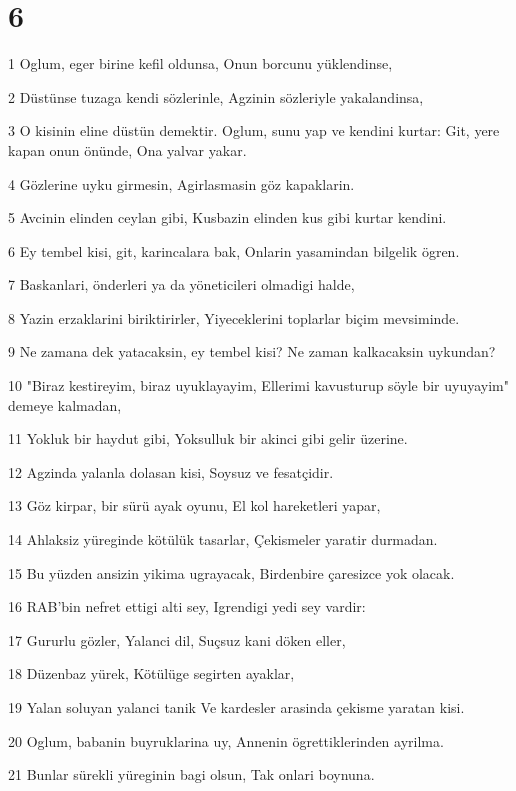 \chapter{6}

\par 1 Oglum, eger birine kefil oldunsa, Onun borcunu yüklendinse,
\par 2 Düstünse tuzaga kendi sözlerinle, Agzinin sözleriyle yakalandinsa,
\par 3 O kisinin eline düstün demektir. Oglum, sunu yap ve kendini kurtar: Git, yere kapan onun önünde, Ona yalvar yakar.
\par 4 Gözlerine uyku girmesin, Agirlasmasin göz kapaklarin.
\par 5 Avcinin elinden ceylan gibi, Kusbazin elinden kus gibi kurtar kendini.
\par 6 Ey tembel kisi, git, karincalara bak, Onlarin yasamindan bilgelik ögren.
\par 7 Baskanlari, önderleri ya da yöneticileri olmadigi halde,
\par 8 Yazin erzaklarini biriktirirler, Yiyeceklerini toplarlar biçim mevsiminde.
\par 9 Ne zamana dek yatacaksin, ey tembel kisi? Ne zaman kalkacaksin uykundan?
\par 10 "Biraz kestireyim, biraz uyuklayayim, Ellerimi kavusturup söyle bir uyuyayim" demeye kalmadan,
\par 11 Yokluk bir haydut gibi, Yoksulluk bir akinci gibi gelir üzerine.
\par 12 Agzinda yalanla dolasan kisi, Soysuz ve fesatçidir.
\par 13 Göz kirpar, bir sürü ayak oyunu, El kol hareketleri yapar,
\par 14 Ahlaksiz yüreginde kötülük tasarlar, Çekismeler yaratir durmadan.
\par 15 Bu yüzden ansizin yikima ugrayacak, Birdenbire çaresizce yok olacak.
\par 16 RAB'bin nefret ettigi alti sey, Igrendigi yedi sey vardir:
\par 17 Gururlu gözler, Yalanci dil, Suçsuz kani döken eller,
\par 18 Düzenbaz yürek, Kötülüge segirten ayaklar,
\par 19 Yalan soluyan yalanci tanik Ve kardesler arasinda çekisme yaratan kisi.
\par 20 Oglum, babanin buyruklarina uy, Annenin ögrettiklerinden ayrilma.
\par 21 Bunlar sürekli yüreginin bagi olsun, Tak onlari boynuna.
